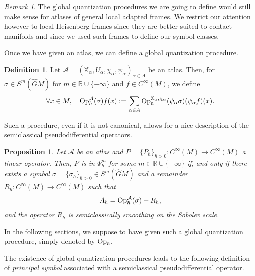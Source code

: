 \documentclass[12pt,a4paper]{amsart}
\theoremstyle{plain}
\newtheorem{proposition}[theorem]{Proposition}
\theoremstyle{definition}
\newtheorem{definition}[theorem]{Definition}
\theoremstyle{remark}
\newtheorem{remark}[theorem]{Remark}
\numberwithin{equation}{section}
\theoremstyle{definition}
\def\R{{\mathbb R}}%
\def \Op{{\rm Op}}
\def \bX{\mathbb{X}}
\def \Ghat{\widehat{G}}
\numberwithin{equation}{section}
\begin{document}
\begin{remark}
    The global quantization procedures we are going to define would still make sense for atlases of general local adapted frames. We restrict our attention however to local Heisenberg frames since they are better suited to contact manifolds and since we used such frames to define our symbol classes.
\end{remark}

Once we have given an atlas, we can define a global quantization procedure.

\begin{definition}
    \label{def:globalquantization}
    Let $\mathcal{A} = (\bX_\alpha,U_\alpha,\chi_\alpha,\psi_\alpha)_{\alpha\in A}$ be an atlas. Then, for $\sigma \in S^m(\Ghat M)$ for $m\in\R\cup\{-\infty\}$ and $f\in C^\infty(M)$, we define 
    \begin{equation*}
        \forall x\in M,\quad \Op_{\hbar}^\mathcal{A}(\sigma)f(x) := \sum_{\alpha\in A}\Op_{\hbar}^{\bX_\alpha,\chi_\alpha}(\psi_\alpha \sigma)(\psi_\alpha f)(x).
    \end{equation*}
\end{definition}

Such a procedure, even if it is not canonical, allows for a nice description of the semiclassical pseudodifferential operators.

\begin{proposition}
    \label{prop:globalquantization}
    Let $\mathcal{A}$ be an atlas and $P = \{P_\hbar\}_{\hbar>0}:C^\infty(M)\rightarrow C^\infty(M)$ a linear operator. Then, $P$ is in $\Psi_{\hbar}^m$ for some $m\in\R\cup\{-\infty\}$ if, and only if there exists a symbol $\sigma = \{\sigma_\hbar\}_{\hbar>0}\in S^m(\Ghat M)$ and a remainder $R_\hbar: C^\infty(M)\rightarrow C^\infty(M)$ such that
    \begin{equation*}
        A_\hbar = \Op_{\hbar}^\mathcal{A}(\sigma) + R_\hbar,
    \end{equation*}
    and the operator $R_\hbar$ is semiclassically smoothing on the Sobolev scale.
\end{proposition}

In the following sections, we suppose to have given such a global quantization procedure, simply denoted by $\Op_\hbar$.

\vspace{0.25cm}

The existence of global quantization procedures leads to the following definition of \emph{principal symbol} associated with a semiclassical pseudodifferential operator.
\end{document}
